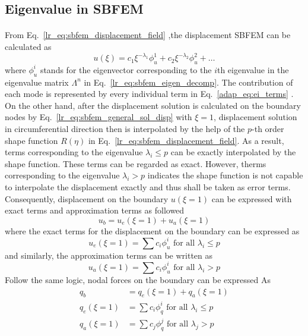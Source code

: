 \subsection{Eigenvalue in SBFEM}
\paragraph{}
From Eq.~\ref{lr_eq:sbfem_displacement_field} ,the displacement SBFEM can be calculated as
\begin{equation}
    u(\xi) = c_1 \xi ^{-\lambda_1} \phi_u^1
            +c_2 \xi ^{-\lambda_2} \phi_u^2
            +\dots
\label{adap_eq:ei_terms}
\end{equation}
where $\phi_u^i$ stands for the eigenvector corresponding to the $i$th eigenvalue in the eigenvalue matrix $\Lambda^{n}$ in Eq.~\ref{lr_eq:sbfem_eigen_decomp}.
The contribution of each mode is represented by every individual term in Eq.~\ref{adap_eq:ei_terms} \cite{Deeks2002}.
On the other hand, after the displacement solution is calculated on the boundary nodes by Eq.~\ref{lr_eq:sbfem_general_sol_disp} with $\xi=1$, displacement solution in circumferential direction then is interpolated by the help of the $p$-th order shape function $R(\eta)$ in Eq.~\ref{lr_eq:sbfem_displacement_field}.
As a result, terms corresponding to the eigenvalue $\lambda_i \leq p$ can be exactly interpolated by the shape function.
These terms can be regarded as exact.
However, therms corresponding to the eigenvalue $\lambda_i > p$ indicates the shape function is not capable to interpolate the displacement exactly and thus shall be taken as error terms.
Consequently, displacement on the boundary $u(\xi=1)$ can be expressed with exact terms and approximation terms as followed
\begin{equation}
    u_b = u_e (\xi=1) + u_a(\xi=1)
\end{equation}
where the exact terms for the displacement on the boundary can be expressed as
\begin{equation}
    u_e (\xi=1) = \sum c_i \phi_u^i \text{   for all  } \lambda_i \leq p
\end{equation}
and similarly, the approximation terms can be written as
\begin{equation}
    u_a (\xi=1) = \sum c_i \phi_u^i \text{   for all  } \lambda_i > p
\end{equation}
Follow the same logic, nodal forces on the boundary can be expressed As
\begin{equation}
    \begin{aligned}
        q_b &= q_e(\xi=1) + q_a(\xi=1) \\
        q_e(\xi=1) &= \sum c_i \phi_q^i \text{   for all  } \lambda_i \leq p \\
        q_a(\xi=1) &= \sum c_j \phi_q^j \text{   for all  } \lambda_j > p \\
    \end{aligned}
\end{equation}
